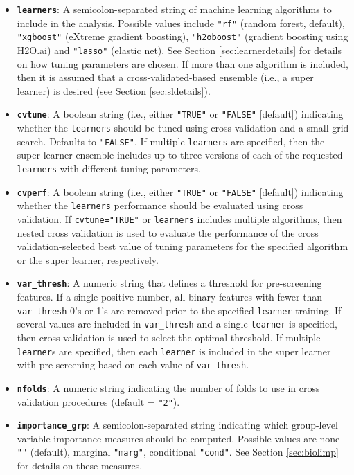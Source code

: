 \documentclass[
]{article}
\begin{document}
\begin{itemize}
\item
  \textbf{\texttt{learners}}: A semicolon-separated string of machine learning algorithms to include in the analysis. Possible values include \texttt{"rf"} (random forest, default), \texttt{"xgboost"} (eXtreme gradient boosting), \texttt{"h2oboost"} (gradient boosting using H2O.ai) and \texttt{"lasso"} (elastic net). See Section \ref{sec:learnerdetails} for details on how tuning parameters are chosen. If more than one algorithm is included, then it is assumed that a cross-validated-based ensemble (i.e., a super learner) is desired (see Section \ref{sec:sldetails}).
\item
  \textbf{\texttt{cvtune}}: A boolean string (i.e., either \texttt{"TRUE"} or \texttt{"FALSE"} {[}default{]}) indicating whether the \texttt{learners} should be tuned using cross validation and a small grid search. Defaults to \texttt{"FALSE"}. If multiple \texttt{learners} are specified, then the super learner ensemble includes up to three versions of each of the requested \texttt{learners} with different tuning parameters.
\item
  \textbf{\texttt{cvperf}}: A boolean string (i.e., either \texttt{"TRUE"} or \texttt{"FALSE"} {[}default{]}) indicating whether the \texttt{learners} performance should be evaluated using cross validation. If \texttt{cvtune="TRUE"} or \texttt{learners} includes multiple algorithms, then nested cross validation is used to evaluate the performance of the cross validation-selected best value of tuning parameters for the specified algorithm or the super learner, respectively.
\item
  \textbf{\texttt{var\_thresh}}: A numeric string that defines a threshold for pre-screening features. If a single positive number, all binary features with fewer than \texttt{var\_thresh} 0's or 1's are removed prior to the specified \texttt{learner} training. If several values are included in \texttt{var\_thresh} and a single \texttt{learner} is specified, then cross-validation is used to select the optimal threshold. If multiple \texttt{learner}s are specified, then each \texttt{learner} is included in the super learner with pre-screening based on each value of \texttt{var\_thresh}.
\item
  \textbf{\texttt{nfolds}}: A numeric string indicating the number of folds to use in cross validation procedures (default = \texttt{"2"}).
\item
  \textbf{\texttt{importance\_grp}}: A semicolon-separated string indicating which group-level variable importance measures should be computed. Possible values are none \texttt{""} (default), marginal \texttt{"marg"}, conditional \texttt{"cond"}. See Section \ref{sec:biolimp} for details on these measures.

\end{itemize}
\end{document}
